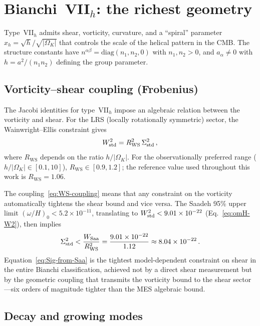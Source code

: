 \section{Bianchi~VII$_h$: the richest geometry}
\label{sec:BVIIh}

Type~VII$_h$ admits shear, vorticity, curvature, and a
``spiral'' parameter $x_h = \sqrt{h}/\sqrt{|\Omega_K|}$
that controls the scale of the helical pattern in the CMB.
The structure constants have $n^{\alpha\beta} =
\mathrm{diag}(n_1, n_2, 0)$ with $n_1, n_2 > 0$, and
$a_\alpha \neq 0$ with $h = a^2/(n_1 n_2)$ defining the
group parameter.


\subsection{Vorticity--shear coupling (Frobenius)}
\label{sec:VIIh-frobenius}

The Jacobi identities for type~VII$_h$ impose an algebraic
relation between the vorticity and shear.  For the LRS
(locally rotationally symmetric) sector, the Wainwright--Ellis
constraint gives
\begin{equation}\label{eq:WS-coupling}
W^2_{\mathrm{std}} = R_{\mathrm{WS}}^2\,\Sigma^2_{\mathrm{std}}\,,
\end{equation}
where $R_{\mathrm{WS}}$ depends on the ratio $h/|\Omega_K|$.
For the observationally preferred range
($h/|\Omega_K| \in [0.1, 10]$),
$R_{\mathrm{WS}} \in [0.9, 1.2]$; the reference value used
throughout this work is $R_{\mathrm{WS}} = 1.06$.

The coupling~\eqref{eq:WS-coupling} means that any constraint
on the vorticity automatically tightens the shear bound and
vice versa.  The Saadeh 95\% upper limit
$(\omega/H)_0 < 5.2 \times 10^{-11}$, translating to
$W^2_{\mathrm{std}} < 9.01 \times 10^{-22}$
(Eq.~\eqref{eq:omH-W2}), then implies
\begin{equation}\label{eq:Sig-from-Saa}
\Sigma^2_{\mathrm{std}} < \frac{W_{\mathrm{Saa}}}{R_{\mathrm{WS}}^2}
= \frac{9.01 \times 10^{-22}}{1.12}
\approx 8.04 \times 10^{-22}\,.
\end{equation}
Equation~\eqref{eq:Sig-from-Saa} is the tightest model-dependent constraint on shear in
the entire Bianchi classification, achieved not by a direct
shear measurement but by the geometric coupling that transmits
the vorticity bound to the shear sector---six orders of
magnitude tighter than the MES algebraic bound.


\subsection{Decay and growing modes}\label{sec:VIIh-modes}

